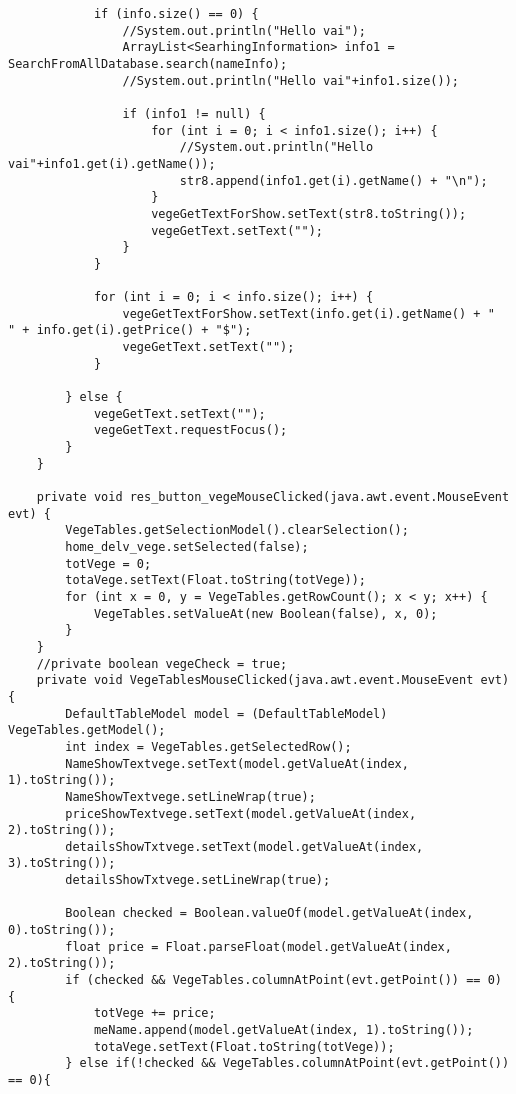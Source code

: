\documentclass[12pt,a4paper]{article}
\begin{document}
\begin{lstlisting}
            if (info.size() == 0) {
                //System.out.println("Hello vai");
                ArrayList<SearhingInformation> info1 = SearchFromAllDatabase.search(nameInfo);
                //System.out.println("Hello vai"+info1.size());

                if (info1 != null) {
                    for (int i = 0; i < info1.size(); i++) {
                        //System.out.println("Hello vai"+info1.get(i).getName());
                        str8.append(info1.get(i).getName() + "\n");
                    }
                    vegeGetTextForShow.setText(str8.toString());
                    vegeGetText.setText("");
                }
            }

            for (int i = 0; i < info.size(); i++) {
                vegeGetTextForShow.setText(info.get(i).getName() + "   " + info.get(i).getPrice() + "$");
                vegeGetText.setText("");
            }

        } else {
            vegeGetText.setText("");
            vegeGetText.requestFocus();
        }
    }                                                        

    private void res_button_vegeMouseClicked(java.awt.event.MouseEvent evt) {                                             
        VegeTables.getSelectionModel().clearSelection();
        home_delv_vege.setSelected(false);
        totVege = 0;
        totaVege.setText(Float.toString(totVege));
        for (int x = 0, y = VegeTables.getRowCount(); x < y; x++) {
            VegeTables.setValueAt(new Boolean(false), x, 0);
        }
    }                                            
    //private boolean vegeCheck = true;
    private void VegeTablesMouseClicked(java.awt.event.MouseEvent evt) {                                        
        DefaultTableModel model = (DefaultTableModel) VegeTables.getModel();
        int index = VegeTables.getSelectedRow();
        NameShowTextvege.setText(model.getValueAt(index, 1).toString());
        NameShowTextvege.setLineWrap(true);
        priceShowTextvege.setText(model.getValueAt(index, 2).toString());
        detailsShowTxtvege.setText(model.getValueAt(index, 3).toString());
        detailsShowTxtvege.setLineWrap(true);

        Boolean checked = Boolean.valueOf(model.getValueAt(index, 0).toString());
        float price = Float.parseFloat(model.getValueAt(index, 2).toString());
        if (checked && VegeTables.columnAtPoint(evt.getPoint()) == 0) {
            totVege += price;
            meName.append(model.getValueAt(index, 1).toString());
            totaVege.setText(Float.toString(totVege));
        } else if(!checked && VegeTables.columnAtPoint(evt.getPoint()) == 0){
            

\end{lstlisting}
\end{document}
